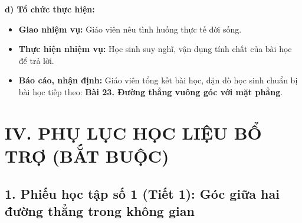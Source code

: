 \documentclass[12pt, a4paper]{article}
\begin{document}
\noindent \textbf{d) Tổ chức thực hiện:}
\begin{itemize}[leftmargin=0.6cm]
    \item \textbf{Giao nhiệm vụ:} Giáo viên nêu tình huống thực tế đời sống.
    \item \textbf{Thực hiện nhiệm vụ:} Học sinh suy nghĩ, vận dụng tính chất của bài học để trả lời.
    \item \textbf{Báo cáo, nhận định:} Giáo viên tổng kết bài học, dặn dò học sinh chuẩn bị bài học tiếp theo: \textbf{Bài 23. Đường thẳng vuông góc với mặt phẳng}.
\end{itemize}

\vspace{10pt}

\section*{IV. PHỤ LỤC HỌC LIỆU BỔ TRỢ (BẮT BUỘC)}

\subsection*{1. Phiếu học tập số 1 (Tiết 1): Góc giữa hai đường thẳng trong không gian}
\end{document}
